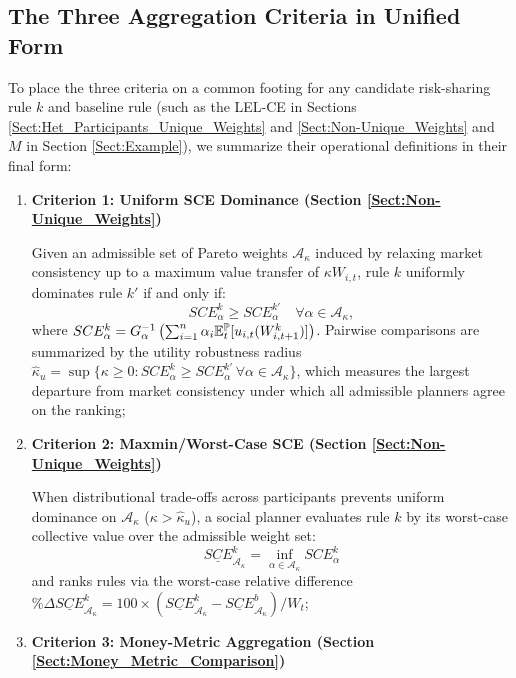\subsection{The Three Aggregation Criteria in Unified Form}
To place the three criteria on a common footing for any candidate risk-sharing rule $k$ and baseline rule (such as the LEL-CE in Sections \ref{Sect:Het_Participants_Unique_Weights} and \ref{Sect:Non-Unique_Weights} and $M$ in Section \ref{Sect:Example}), we summarize their operational definitions in their final form:
\begin{enumerate}
    \item \textbf{Criterion 1: Uniform SCE Dominance (Section \ref{Sect:Non-Unique_Weights})}
    
    Given an admissible set of Pareto weights $\mathcal{A}_\kappa$ induced by relaxing market consistency up to a maximum value transfer of $\kappa W_{i,t}$, rule $k$ uniformly dominates rule $k'$ if and only if:
    \begin{equation}
        SCE_{\alpha}^k \ge SCE_{\alpha}^{k'} \quad \forall \alpha \in \mathcal{A}_\kappa,
    \end{equation}
    where $SCE_{\alpha}^k = G_{\alpha}^{-1}\left(\sum_{i=1}^n \alpha_i \mathbb{E}_t^{\mathbb{P}}[u_{i,t}(W_{i,t+1}^k)]\right)$. Pairwise comparisons are summarized by the utility robustness radius $\hat{\kappa}_u = \sup\{\kappa \ge 0 : SCE_{\alpha}^k \ge SCE_{\alpha}^{k'} \, \forall \alpha \in \mathcal{A}_\kappa\}$, which measures the largest departure from market consistency under which all admissible planners agree on the ranking;
    \item \textbf{Criterion 2: Maxmin/Worst-Case SCE (Section \ref{Sect:Non-Unique_Weights})}
    
    When distributional trade-offs across participants prevents uniform dominance on $\mathcal{A}_\kappa$ ($\kappa > \hat{\kappa}_u$), a social planner evaluates rule $k$ by its worst-case collective value over the admissible weight set:
    \begin{equation}
        \underline{SCE}_{\mathcal{A}_\kappa}^k = \inf_{\alpha \in \mathcal{A}_\kappa} SCE_{\alpha}^k
    \end{equation}
    and ranks rules via the worst-case relative difference $\%\Delta \underline{SCE}_{\mathcal{A}_\kappa}^k = 100 \times (\underline{SCE}_{\mathcal{A}_\kappa}^k - \underline{SCE}_{\mathcal{A}_\kappa}^b)/W_t$;
    \item \textbf{Criterion 3: Money-Metric Aggregation (Section \ref{Sect:Money_Metric_Comparison})}
    

\end{enumerate}
